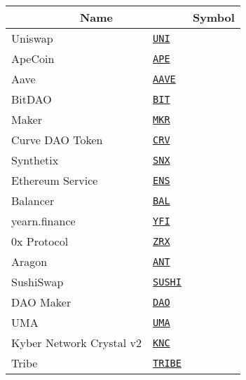 \begin{tabular}{llll}
\toprule
\multicolumn{2}{|c|}{Name} & \multicolumn{2}{|c|}{Symbol} \\
\midrule
Uniswap & \href{https://etherscan.io/address/0x1f9840a85d5af5bf1d1762f925bdaddc4201f984}{\tt UNI} \\
ApeCoin & \href{https://etherscan.io/address/0x4d224452801aced8b2f0aebe155379bb5d594381}{\tt APE} \\
Aave & \href{https://etherscan.io/address/0x7Fc66500c84A76Ad7e9c93437bFc5Ac33E2DDaE9}{\tt AAVE} \\
BitDAO & \href{https://etherscan.io/address/0x1A4b46696b2bB4794Eb3D4c26f1c55F9170fa4C5}{\tt BIT} \\
Maker & \href{https://etherscan.io/address/0x9f8f72aa9304c8b593d555f12ef6589cc3a579a2}{\tt MKR} \\
Curve DAO Token & \href{https://etherscan.io/address/0xD533a949740bb3306d119CC777fa900bA034cd52}{\tt CRV} \\
Synthetix & \href{https://etherscan.io/address/0xc011a73ee8576fb46f5e1c5751ca3b9fe0af2a6f}{\tt SNX} \\
Ethereum \multicolumn{2}{|c|}{Name} Service & \href{https://etherscan.io/address/0xC18360217D8F7Ab5e7c516566761Ea12Ce7F9D72}{\tt ENS} \\
Balancer & \href{https://etherscan.io/address/0xba100000625a3754423978a60c9317c58a424e3D}{\tt BAL} \\
yearn.finance & \href{https://etherscan.io/address/0x0bc529c00c6401aef6d220be8c6ea1667f6ad93e}{\tt YFI} \\
0x Protocol & \href{https://etherscan.io/address/0xe41d2489571d322189246dafa5ebde1f4699f498}{\tt ZRX} \\
Aragon & \href{https://etherscan.io/address/0xa117000000f279d81a1d3cc75430faa017fa5a2e}{\tt ANT} \\
SushiSwap & \href{https://etherscan.io/address/0x6b3595068778dd592e39a122f4f5a5cf09c90fe2}{\tt SUSHI} \\
DAO Maker & \href{https://etherscan.io/address/0x0f51bb10119727a7e5ea3538074fb341f56b09ad}{\tt DAO} \\
UMA & \href{https://etherscan.io/address/0x04Fa0d235C4abf4BcF4787aF4CF447DE572eF828}{\tt UMA} \\
Kyber Network Crystal v2 & \href{https://etherscan.io/address/0xdeFA4e8a7bcBA345F687a2f1456F5Edd9CE97202}{\tt KNC} \\
Tribe & \href{https://etherscan.io/address/0xc7283b66Eb1EB5FB86327f08e1B5816b0720212B}{\tt TRIBE} \\

\end{tabular}
